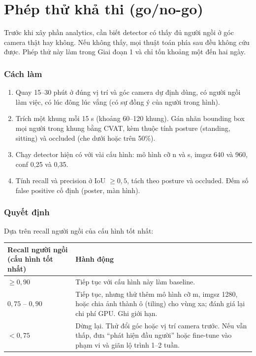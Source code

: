 \documentclass[10pt,a4paper,oneside,openany]{report}
\newcommand{\breakus}{\textunderscore\allowbreak}
\newcommand{\code}[1]{{\ttfamily\let\_\breakus #1}}
\newcommand{\tabhead}[1]{\textsf{\bfseries\color{ink}#1}}
\newenvironment{bang}{\par\small\rowcolors{2}{rowgray}{white}}{\par\vspace{0.3em}}
\begin{document}
\section{Phép thử khả thi (go/no-go)}\label{sec:gonogo}
Trước khi xây phần analytics, cần biết detector có thấy đủ người ngồi ở góc camera thật hay không. Nếu không thấy, mọi thuật toán phía
sau đều không cứu được. Phép thử này làm trong Giai đoạn 1 và chỉ tốn khoảng một đến hai ngày.

\subsubsection{Cách làm}
\begin{enumerate}
  \item Quay 15--30 phút ở đúng vị trí và góc camera dự định dùng, có người ngồi làm việc, có lúc đông lúc vắng (có sự đồng ý của người trong hình).
  \item Trích một khung mỗi 15 s (khoảng 60--120 khung). Gán nhãn bounding box mọi người trong khung bằng CVAT, kèm thuộc tính
        \code{posture} (\code{standing}, \code{sitting}) và \code{occluded} (che dưới hoặc trên 50\%).
  \item Chạy detector hiện có với vài cấu hình: mô hình cỡ n và s, \code{imgsz} 640 và 960, \code{conf} 0,25 và 0,35.
  \item Tính recall và precision ở IoU $\ge 0{,}5$, tách theo \code{posture} và \code{occluded}. Đếm số false positive cố định (poster, màn hình).
\end{enumerate}

\subsubsection{Quyết định} Dựa trên recall người ngồi của cấu hình tốt nhất:

\begin{bang}
\begin{tabularx}{\linewidth}{L{44mm}Y}
\toprule
\tabhead{Recall người ngồi (cấu hình tốt nhất)} & \tabhead{Hành động} \\
\midrule
$\ge 0{,}90$ & Tiếp tục với cấu hình này làm baseline. \\
$0{,}75$ -- $0{,}90$ & Tiếp tục, nhưng thử thêm mô hình cỡ m, \code{imgsz} 1280, hoặc chia ảnh thành ô (tiling) cho vùng xa; đánh giá lại chi phí GPU. Ghi giới hạn. \\
$< 0{,}75$ & Dừng lại. Thử đổi góc hoặc vị trí camera trước. Nếu vẫn thấp, đưa \enquote{phát hiện đầu người} hoặc fine-tune vào phạm vi và giãn lộ trình 1--2 tuần. \\
\bottomrule
\end{tabularx}
\end{bang}
\end{document}
